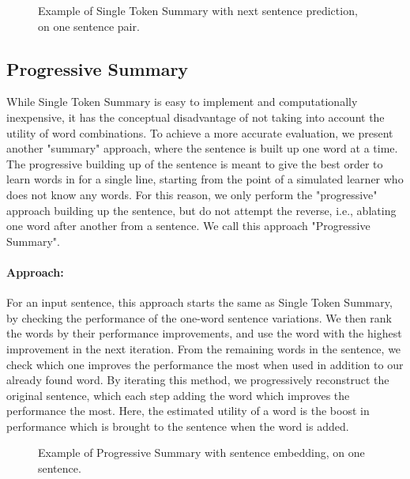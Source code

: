\begin{figure}[H]
	
	\caption{Example of Single Token Summary with next sentence prediction, on one sentence pair.}
	\label{fig:single-token-summary-nsp}
\end{figure}


\subsection{Progressive Summary}
While Single Token Summary is easy to implement and computationally inexpensive, it has the conceptual disadvantage of not taking into account the utility of word combinations.
To achieve a more accurate evaluation, we present another "summary" approach, where the sentence is built up one word at a time.
The progressive building up of the sentence is meant to give the best order to learn words in for a single line, starting from the point of a simulated learner who does not know any words.
For this reason, we only perform the "progressive" approach building up the sentence, but do not attempt the reverse, i.e., ablating one word after another from a sentence.
We call this approach "Progressive Summary".

\paragraph{Approach:}
For an input sentence, this approach starts the same as Single Token Summary, by checking the performance of the one-word sentence variations.
We then rank the words by their performance improvements, and use the word with the highest improvement in the next iteration.
From the remaining words in the sentence, we check which one improves the performance the most when used in addition to our already found word.
By iterating this method, we progressively reconstruct the original sentence, which each step adding the word which improves the performance the most.
Here, the estimated utility of a word is the boost in performance which is brought to the sentence when the word is added.

\begin{figure}[H]
	
	\caption{Example of Progressive Summary with sentence embedding, on one sentence.}
	\label{fig:progressive-summary}
\end{figure}

